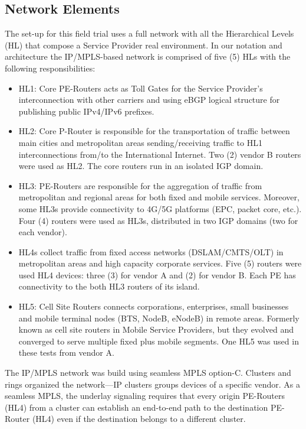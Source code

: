 \documentclass[10pt, conference]{IEEEtran}
\begin{document}

\subsection{Network Elements}
\label{sec:netlay}
The set-up for this field trial uses a full network with all the Hierarchical Levels (HL) that compose a Service Provider real environment. In our notation and architecture the IP/MPLS-based network is comprised of five (5) HLs with the following responsibilities: 

\begin{itemize}
    \item HL1: Core PE-Routers acts as Toll Gates for the Service Provider's interconnection with other carriers and using eBGP logical structure for publishing public IPv4/IPv6 prefixes. 
    \item HL2: Core P-Router is responsible for the transportation of traffic between main cities and metropolitan areas sending/receiving traffic to HL1 interconnections from/to the International Internet. Two (2) vendor B routers were used as HL2. The core routers run in an isolated IGP domain.
    \item HL3: PE-Routers are responsible for the aggregation of traffic from metropolitan and regional areas for both fixed and mobile services. Moreover, some HL3s provide connectivity to 4G/5G platforms (EPC, packet core, etc.).
    Four (4) routers were used as HL3s, distributed in two IGP domains (two for each vendor).
    \item HL4s collect traffic from fixed access networks (DSLAM/CMTS/OLT) in metropolitan areas and high capacity corporate services. Five (5) routers were used HL4 devices: three (3) for vendor A and (2) for vendor B. Each PE has connectivity to the both HL3 routers of its island.
    \item HL5: Cell Site Routers connects corporations, enterprises, small businesses and mobile terminal nodes (BTS, NodeB, eNodeB) in remote areas. Formerly known as cell site routers in Mobile Service Providers, but they evolved and converged to serve multiple fixed plus mobile segments. One HL5 was used in these tests from vendor A.
\end{itemize}

The IP/MPLS network was build using seamless MPLS option-C. Clusters and rings organized the network—IP clusters groups devices of a specific vendor. As a seamless MPLS, the underlay signaling requires that every origin PE-Routers (HL4) from a cluster can establish an end-to-end path to the destination PE-Router (HL4) even if the destination belongs to a different cluster. 
\end{document}
